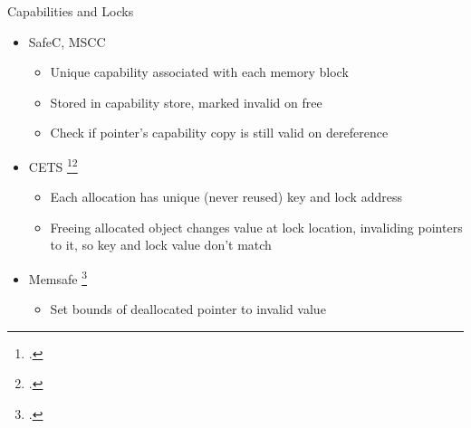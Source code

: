 \documentclass[aspectratio=169]{beamer}
\begin{document}
\begin{frame}{Capabilities and Locks}
    \pause
    \begin{itemize}
        \item SafeC, MSCC %
            \begin{itemize}
              \item Unique capability associated with each memory block
              \item Stored in capability store, marked invalid on free
              \item Check if pointer's capability copy is still valid on dereference
            \end{itemize}
        \pause
        \item CETS \footcite{nagarakatte_cets:_2010}\footcite{nagarakatte_everything_2015}
            \begin{itemize}
                \item Each allocation has unique (never reused) key and lock address 
                \item Freeing allocated object changes value at lock location, invaliding pointers to it, so key and lock value don't match
            \end{itemize}
        \pause
        \item Memsafe \footcite{simpson_memsafe:_2013}
            \begin{itemize}
                \item Set bounds of deallocated pointer to invalid value %
            \end{itemize}
    \end{itemize}
\end{frame}
\end{document}
